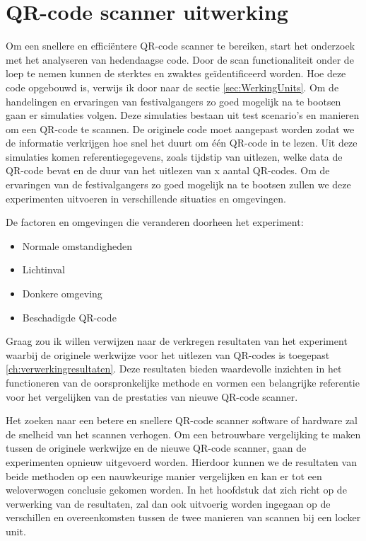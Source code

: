 \section{QR-code scanner uitwerking}%
\label{sec:scannerUitwerking}

Om een snellere en efficiëntere QR-code scanner te bereiken, start het onderzoek met het analyseren van hedendaagse code. Door de scan functionaliteit onder de loep te nemen kunnen de sterktes en zwaktes geïdentificeerd worden. Hoe deze code opgebouwd is, verwijs ik door naar de sectie \ref{sec:WerkingUnits}.
Om de handelingen en ervaringen van festivalgangers zo goed mogelijk na te bootsen gaan er simulaties volgen. Deze simulaties bestaan uit test scenario’s en manieren om een QR-code te scannen. De originele code moet aangepast worden zodat we de informatie verkrijgen hoe snel het duurt om één QR-code in te lezen. Uit deze simulaties komen referentiegegevens, zoals tijdstip van uitlezen, welke data de QR-code bevat en de duur van het uitlezen van x aantal QR-codes. Om de ervaringen van de festivalgangers zo goed mogelijk na te bootsen zullen we deze experimenten uitvoeren in verschillende situaties en omgevingen.

De factoren en omgevingen die veranderen doorheen het experiment:

\begin{itemize}
    \item Normale omstandigheden
    \item Lichtinval
    \item Donkere omgeving
    \item Beschadigde QR-code     
\end{itemize}


Graag zou ik willen verwijzen naar de verkregen resultaten van het experiment waarbij de originele werkwijze voor het uitlezen van QR-codes is toegepast \ref{ch:verwerkingresultaten}. Deze resultaten bieden waardevolle inzichten in het functioneren van de oorspronkelijke methode en vormen een belangrijke referentie voor het vergelijken van de prestaties van nieuwe QR-code scanner.

Het zoeken naar een betere en snellere QR-code scanner software of hardware zal de snelheid van het scannen verhogen. Om een betrouwbare vergelijking te maken tussen de originele werkwijze en de nieuwe QR-code scanner, gaan de experimenten opnieuw uitgevoerd worden. Hierdoor kunnen we de resultaten van beide methoden op een nauwkeurige manier vergelijken en kan er tot een weloverwogen conclusie gekomen worden. In het hoofdstuk dat zich richt op de verwerking van de resultaten, zal dan ook uitvoerig worden ingegaan op de verschillen en overeenkomsten tussen de twee manieren van scannen bij een locker unit.

